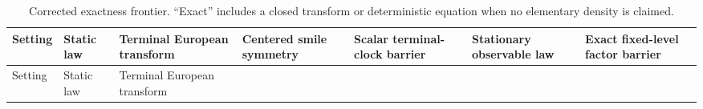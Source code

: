 \documentclass[
  english,
  11pt,
  letterpaper,
  DIV=11,
  numbers=noendperiod]{scrartcl}
\theoremstyle{plain}
\theoremstyle{plain}
\theoremstyle{plain}
\theoremstyle{plain}
\theoremstyle{remark}
\begin{document}
\begin{longtable}[]{@{}
  >{\raggedright\arraybackslash}p{}
  >{\raggedright\arraybackslash}p{}
  >{\raggedright\arraybackslash}p{}
  >{\raggedright\arraybackslash}p{}
  >{\raggedright\arraybackslash}p{}
  >{\raggedright\arraybackslash}p{}
  >{\raggedright\arraybackslash}p{}@{}}
\caption{Corrected exactness frontier. ``Exact'' includes a closed
transform or deterministic equation when no elementary density is
claimed.}\label{tbl-exactness-map}\tabularnewline
\toprule\noalign{}
\begin{minipage}[b]{\linewidth}\raggedright
Setting
\end{minipage} & \begin{minipage}[b]{\linewidth}\raggedright
Static law
\end{minipage} & \begin{minipage}[b]{\linewidth}\raggedright
Terminal European transform
\end{minipage} & \begin{minipage}[b]{\linewidth}\raggedright
Centered smile symmetry
\end{minipage} & \begin{minipage}[b]{\linewidth}\raggedright
Scalar terminal-clock barrier
\end{minipage} & \begin{minipage}[b]{\linewidth}\raggedright
Stationary observable law
\end{minipage} & \begin{minipage}[b]{\linewidth}\raggedright
Exact fixed-level factor barrier
\end{minipage} \\
\midrule\noalign{}
\endfirsthead
\toprule\noalign{}
\begin{minipage}[b]{\linewidth}\raggedright
Setting
\end{minipage} & \begin{minipage}[b]{\linewidth}\raggedright
Static law
\end{minipage} & \begin{minipage}[b]{\linewidth}\raggedright
Terminal European transform
\end{minipage} & \begin{minipage}[b]{\linewidth}\raggedright

\end{minipage}
\end{longtable}
\end{document}
